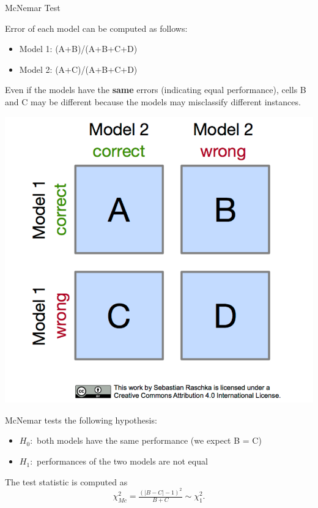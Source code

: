 \begin{frame}[c,allowframebreaks]{McNemar Test}
    \framebreak

    \begin{minipage}[c]{0.625\linewidth}
    Error of each model can be computed as follows:
    \begin{itemize}
      \item Model 1: (A+B)/(A+B+C+D)
      \item Model 2: (A+C)/(A+B+C+D)
    \end{itemize}

    Even if the models have the \textbf{same} errors (indicating equal performance), cells B and C may be different because the models may misclassify different instances.
    \end{minipage}
    \begin{minipage}[c]{0.2\linewidth}
        \includegraphics[width=\textwidth]{mcnemar_1.png}
    \end{minipage}

    \medskip

    McNemar tests the following hypothesis:
    \begin{itemize}
    \item $H_0:$ both models have the same performance (we expect B = C)
    \item $H_1:$ performances of the two models are not equal
    \end{itemize}

    The test statistic is computed as
    $$\chi^2_{Mc} =  \tfrac{(|B-C| - 1)^2}{B + C} \sim \chi^2_{1}.$$


\end{frame}
